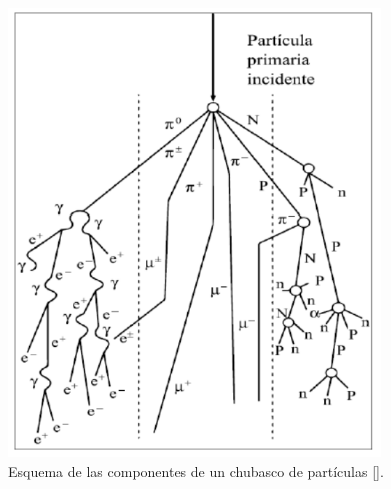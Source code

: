 \begin{frame}{}
\begin{columns}
            \begin{column}{0.3\textwidth} %
                \begin{figure}
                    \centering
                    \includegraphics[width=0.88\textwidth]{Figures/showercomponent.png}
                    \caption{\tiny Esquema de las componentes de un chubasco de partículas [\cite{valdezgalicia1992}].}
                \end{figure}
            \end{column}
        \end{columns}
    \end{frame}     

        
